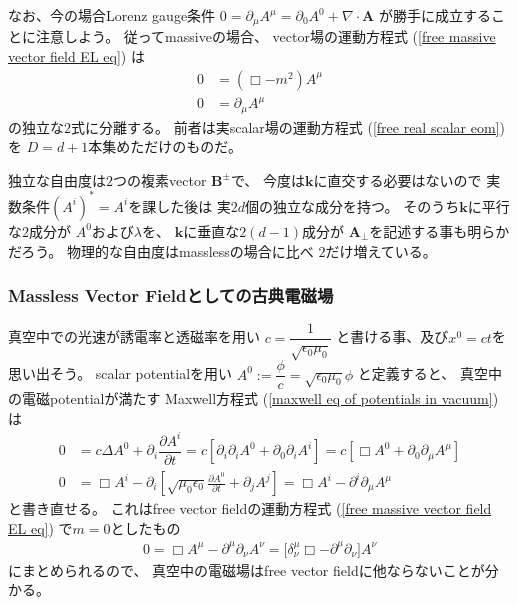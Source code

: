 \begin{enumerate}
    なお、今の場合Lorenz gauge条件
    $0 = \partial_\mu A^\mu
    = \partial_0 A^0 + \nabla \cdot \bm{A}$
    が勝手に成立することに注意しよう。
    従ってmassiveの場合、
    vector場の運動方程式
    (\ref{free massive vector field EL eq})
    は
    \begin{subequations}
    \begin{align}
        0
    &=
        (\Box - m^2) A^\mu
    \\
        0
    &=
        \partial_\mu A^\mu
    \end{align}
    \end{subequations}
    の独立な$2$式に分離する。
    前者は実scalar場の運動方程式
    (\ref{free real scalar eom})を
    $D = d + 1$本集めただけのものだ。

    独立な自由度は$2$つの複素vector $\bm{B}^\pm$で、
    今度は$\bm{k}$に直交する必要はないので
    実数条件$(A^i)^* = A^i$を課した後は
    実$2d$個の独立な成分を持つ。
    そのうち$\bm{k}$に平行な$2$成分が
    $A^0$および$\lambda$を、
    $\bm{k}$に垂直な$2(d-1)$成分が
    $\bm{A}_\perp$を記述する事も明らかだろう。
    物理的な自由度はmasslessの場合に比べ
    $2$だけ増えている。
\end{enumerate}

\subsubsection{Massless Vector Fieldとしての古典電磁場}

真空中での光速が誘電率と透磁率を用い
$c = \dfrac{1}{\sqrt{ \epsilon_0 \mu_0 }}$
と書ける事、及び$x^0 = ct$を思い出そう。
scalar potentialを用い
$A^0 := \dfrac{\phi}{c}
= \sqrt{\epsilon_0 \mu_0} \phi$
と定義すると、
真空中の電磁potentialが満たす
Maxwell方程式
(\ref{maxwell eq of potentials in vacuum})
は
\begin{subequations}
\begin{align}
  0
&=
    c \Delta A^0
  +
    \partial_i
    \dfrac{\partial A^i}
      {\partial t}
=
    c
    \left[
        \partial_i \partial_i A^0
      +
        \partial_0
        \partial_i A^i
    \right]
=
    c
    \left[
        \Box A^0
      +
        \partial_0
        \partial_\mu A^\mu
    \right]
\\
  0
&=
  \Box A^i
-
  \partial_i
  \left[
    \sqrt{ \mu_0 \epsilon_0 }
    \frac{\partial A^0}
      {\partial t}
  +
    \partial_j A^j
  \right]
=
    \Box A^i
    - \partial^i
    	\partial_\mu A^\mu
\end{align}
\end{subequations}
と書き直せる。
これはfree vector fieldの運動方程式
(\ref{free massive vector field EL eq})
で$m = 0$としたもの
\begin{align}
    0 =
    \Box A^\mu
    - \partial^\mu
    \partial_\nu A^\nu
=
    \bigg[
		\delta^\mu_\nu \Box
    - \partial^\mu \partial_\nu
    \bigg] A^\nu
\end{align}
にまとめられるので、
真空中の電磁場はfree vector fieldに他ならないことが分かる。

